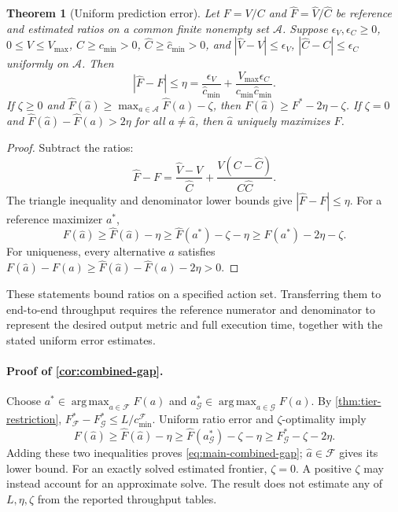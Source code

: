 \documentclass{article}
\newtheorem{theorem}{Theorem}
\begin{document}
\begin{theorem}[Uniform prediction error]
\label{thm:prediction-error}
Let $F=V/C$ and $\widehat F=\widehat V/\widehat C$ be reference and estimated ratios on a common finite nonempty set $\mathcal A$. Suppose $\epsilon_V,\epsilon_C\ge0$, $0\le V\le V_{\max}$, $C\ge c_{\min}>0$, $\widehat C\ge\widehat c_{\min}>0$, and
$|\widehat V-V|\le\epsilon_V$, $|\widehat C-C|\le\epsilon_C$ uniformly on $\mathcal A$. Then
\[
|\widehat F-F|\le\eta
=\frac{\epsilon_V}{\widehat c_{\min}}
+\frac{V_{\max}\epsilon_C}{c_{\min}\widehat c_{\min}}.
\]
If $\zeta\ge0$ and $\widehat F(\widehat a)\ge\max_{a\in\mathcal A}\widehat F(a)-\zeta$, then $F(\widehat a)\ge F^*-2\eta-\zeta$. If $\zeta=0$ and $\widehat F(\widehat a)-\widehat F(a)>2\eta$ for all $a\ne\widehat a$, then $\widehat a$ uniquely maximizes $F$.
\end{theorem}
\begin{proof}
Subtract the ratios:
\[
\widehat F-F=\frac{\widehat V-V}{\widehat C}
+\frac{V(C-\widehat C)}{C\widehat C}.
\]
The triangle inequality and denominator lower bounds give $|\widehat F-F|\le\eta$. For a reference maximizer $a^*$,
\[
F(\widehat a)\ge\widehat F(\widehat a)-\eta
\ge\widehat F(a^*)-\zeta-\eta
\ge F(a^*)-2\eta-\zeta.
\]
For uniqueness, every alternative $a$ satisfies
$F(\widehat a)-F(a)\ge\widehat F(\widehat a)-\widehat F(a)-2\eta>0$.
\end{proof}

These statements bound ratios on a specified action set. Transferring them to end-to-end throughput requires the reference numerator and denominator to represent the desired output metric and full execution time, together with the stated uniform error estimates.

\paragraph{Proof of \cref{cor:combined-gap}.}
Choose $a^*\in\operatorname*{arg\,max}_{a\in\mathcal F}F(a)$ and $a^*_{\mathcal G}\in\operatorname*{arg\,max}_{a\in\mathcal G}F(a)$. By \cref{thm:tier-restriction},
$F^*_{\mathcal F}-F^*_{\mathcal G}\le L/c_{\min}^{\mathcal F}$.
Uniform ratio error and $\zeta$-optimality imply
\[
F(\widehat a)\ge\widehat F(\widehat a)-\eta
\ge\widehat F(a^*_{\mathcal G})-\zeta-\eta
\ge F^*_{\mathcal G}-\zeta-2\eta.
\]
Adding these two inequalities proves \cref{eq:main-combined-gap}; $\widehat a\in\mathcal F$ gives its lower bound. For an exactly solved estimated frontier, $\zeta=0$. A positive $\zeta$ may instead account for an approximate solve. The result does not estimate any of $L,\eta,\zeta$ from the reported throughput tables.
\end{document}
